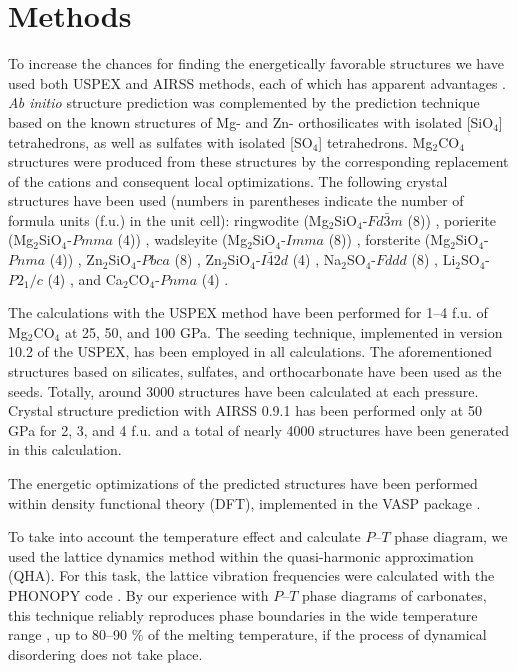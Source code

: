 \documentclass[a4paperm]{article}
\begin{document}
		\section*{Methods}

To increase the chances for finding the energetically favorable structures we have used both USPEX and AIRSS methods, each of which has apparent advantages \cite{oganov2019}.
{\it Ab initio} structure prediction was complemented by the prediction technique based on the known structures of Mg- and Zn- orthosilicates with isolated [SiO$_4$] tetrahedrons, as well as sulfates with isolated [SO$_4$] tetrahedrons. 
Mg$_2$CO$_4$ structures were produced from these structures by the corresponding replacement of the cations and consequent local optimizations.
The following crystal structures have been used (numbers in parentheses indicate the number of formula units (f.u.) in the unit cell): 
{\color{blue}
ringwodite (Mg$_2$SiO$_4$-$Fd\bar{3}m$ (8)) \cite{kanzaki2019},  
porierite (Mg$_2$SiO$_4$-$Pmma$ (4)) \cite{tomioka2021}, 
wadsleyite (Mg$_2$SiO$_4$-$Imma$ (8)) \cite{horiuchi1981}, 
forsterite (Mg$_2$SiO$_4$-$Pnma$ (4)) \cite{smyth1973},
}
 Zn$_2$SiO$_4$-$Pbca$ (8) \cite{kanzaki2019}, 
 Zn$_2$SiO$_4$-$I\bar{4}2d$ (4) \cite{kanzaki2019}, Na$_2$SO$_4$-$Fddd$ (8) \cite{hawthorne1975}, Li$_2$SO$_4$-$P2_1/c$ (4) \cite{alcock1973}, and Ca$_2$CO$_4$-$Pnma$ (4) \cite{sagatova2020_ortho}.

 
The calculations with the USPEX method \cite{uspex1,uspex2,uspex3,uspex_topology} have been performed for 1--4 f.u. of Mg$_2$CO$_4$ at 25, 50, and 100 GPa.
The seeding technique, implemented in version 10.2 of the USPEX, has been employed in all calculations.
The aforementioned structures based on silicates, sulfates, and orthocarbonate have been used as the seeds.
Totally, around 3000 structures have been calculated at each pressure.
Crystal structure prediction with AIRSS 0.9.1 \cite{airss1,airss2} has been performed only at 50 GPa for 2, 3, and 4 f.u. and a total of nearly 4000 structures have been generated in this calculation.

The energetic optimizations of the predicted structures have been performed within density functional theory (DFT), implemented in the VASP package \cite{vasp1,vasp2}.

To take into account the temperature effect and calculate $P$--$T$ phase diagram, we used the lattice dynamics method within the quasi-harmonic approximation (QHA).
For this task, the lattice vibration frequencies were calculated with the PHONOPY code \cite{phonopy}.
By our experience with $P$--$T$ phase diagrams of carbonates, this technique reliably reproduces phase boundaries in the wide temperature range \cite{gavr2019_alk, gavr2020_disarag, sagatova2020_ortho}, up to 80--90 \% of the melting temperature, if the process of dynamical disordering does not take place.
\end{document}
